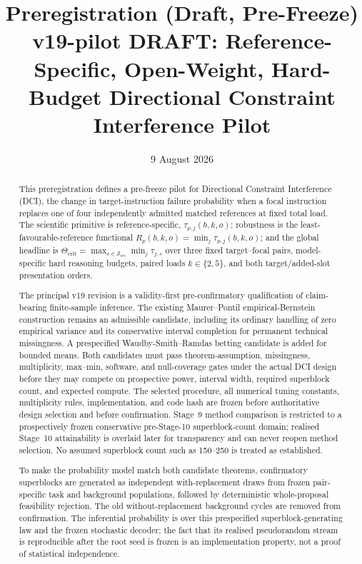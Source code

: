 \documentclass[11pt,a4paper]{article}
\title{\textbf{Preregistration (Draft, Pre-Freeze)}\\[0.5em]
\large v19-pilot DRAFT: Reference-Specific, Open-Weight, Hard-Budget Directional Constraint Interference Pilot}
\author{}
\date{9 August 2026}
\begin{document}
\maketitle
\begin{abstract}
This preregistration defines a pre-freeze pilot for Directional Constraint Interference (DCI), the change in target-instruction failure probability when a focal instruction replaces one of four independently admitted matched references at fixed total load. The scientific primitive is reference-specific, $\tau_{p,j}(b,k,o)$; robustness is the least-favourable-reference functional $R_p(b,k,o)=\min_j\tau_{p,j}(b,k,o)$; and the global headline is $\Theta_{\mathrm{crit}}=\max_{s\in\mathcal S_{\mathrm{ret}}}\min_j\tau_{j,s}$ over three fixed target--focal pairs, model-specific hard reasoning budgets, paired loads $k\in\{2,5\}$, and both target/added-slot presentation orders.

The principal v19 revision is a validity-first pre-confirmatory qualification of claim-bearing finite-sample inference. The existing Maurer--Pontil empirical-Bernstein construction remains an admissible candidate, including its ordinary handling of zero empirical variance and its conservative interval completion for permanent technical missingness. A prespecified Waudby-Smith--Ramdas betting candidate is added for bounded means. Both candidates must pass theorem-assumption, missingness, multiplicity, max--min, software, and null-coverage gates under the actual DCI design before they may compete on prospective power, interval width, required superblock count, and expected compute. The selected procedure, all numerical tuning constants, multiplicity rules, implementation, and code hash are frozen before authoritative design selection and before confirmation. Stage~9 method comparison is restricted to a prospectively frozen conservative pre-Stage-10 superblock-count domain; realised Stage~10 attainability is overlaid later for transparency and can never reopen method selection. No assumed superblock count such as 150--250 is treated as established.

To make the probability model match both candidate theorems, confirmatory superblocks are generated as independent with-replacement draws from frozen pair-specific task and background populations, followed by deterministic whole-proposal feasibility rejection. The old without-replacement background cycles are removed from confirmation. The inferential probability is over this prespecified superblock-generating law and the frozen stochastic decoder; the fact that its realised pseudorandom stream is reproducible after the root seed is frozen is an implementation property, not a proof of statistical independence.


\end{abstract}
\end{document}
